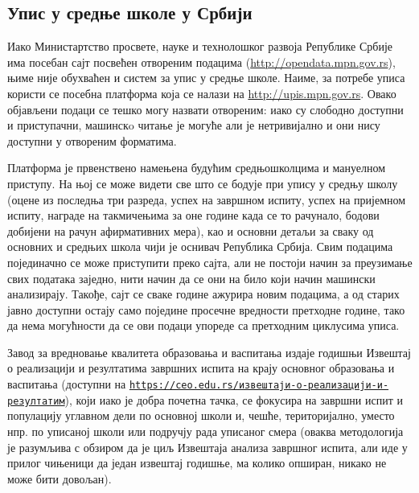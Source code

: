 \subsection{Упис у средње школе у Србији}

Иако Министартство просвете, науке и технолошког развоја Републике Србије има посебан сајт посвећен отвореним подацима (\url{http://opendata.mpn.gov.rs}), њиме није обухваћен и систем за упис у средње школе. Наиме, за потребе уписа користи се посебна платформа која се налази на \url{http://upis.mpn.gov.rs}. Овако објављени подаци се тешко могу назвати отвореним: иако су слободно доступни и приступачни, машинскo читање је могуће али је нетривијално и они нису доступни у отвореним форматима. 

Платформа је првенствено намењена будућим средњошколцима и мануелном приступу. На њој се може видети све што се бодује при упису у средњу школу (оцене из последња три разреда, успех на завршном испиту, успех на пријемном испиту, награде на такмичењима за оне године када се то рачунало, бодови добијени на рачун афирмативних мера), као и основни детаљи за сваку од основних и средњих школа чији је оснивач Република Србија. Свим подацима појединачно се може приступити преко сајта, али не постоји начин за преузимање свих података заједно, нити начин да се они на било који начин машински анализирају. Такође, сајт се сваке године ажурира новим подацима, а од старих јавно доступни остају само поједине просечне вредности претходне године, тако да нема могућности да се ови подаци упореде са претходним циклусима уписа.

Завод за вредновање квалитета образовања и васпитања издаје годишњи Извештај о реализацији и резултатима завршних испита на крају основног образовања и васпитања (доступни на \texttt{\href{https://ceo.edu.rs/\%D0\%B8\%D0\%B7\%D0\%B2\%D0\%B5\%D1\%88\%D1\%82\%D0\%B0\%D1\%98\%D0\%B8-\%D0\%BE-\%D1\%80\%D0\%B5\%D0\%B0\%D0\%BB\%D0\%B8\%D0\%B7\%D0\%B0\%D1\%86\%D0\%B8\%D1\%98\%D0\%B8-\%D0\%B8-\%D1\%80\%D0\%B5\%D0\%B7\%D1\%83\%D0\%BB\%D1\%82\%D0\%B0\%D1\%82\%D0\%B8\%D0\%BC/}{https://ceo.edu.rs/извештаји-о-реализацији-и-резултатим}}), који иако је добра почетна тачка, се фокусира на завршни испит и популацију углавном дели по основној школи и, чешће, територијално, уместо нпр. по уписаној школи или подручју рада уписаног смера (оваква методологија је разумљива с обзиром да је циљ Извештаја анализа завршног испита, али иде у прилог чињеници да један извештај годишње, ма колико опширан, никако не може бити довољан).

